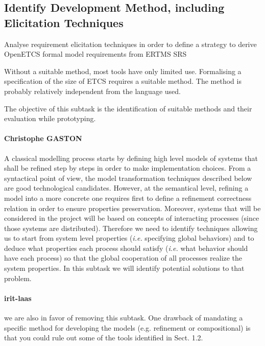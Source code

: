 \documentclass{template/openetcs_article}
\begin{document}
\subsection{Identify Development Method, including Elicitation Techniques}

Analyse requirement elicitation techniques in order to define a strategy to derive OpenETCS formal model requirements from ERTMS SRS

Without a suitable method, most tools have only limited use.  Formalising a specification of the size of ETCS requires a suitable method.  The method is probably relatively independent from the language used.

The objective of this subtask is the identification of suitable methods and their evaluation while prototyping.

\paragraph{Christophe GASTON}
A classical modelling process starts by defining high level models of systems that shall be refined step by steps in order
to make implementation choices. From a syntactical point of view, the model transformation techniques described below are good technological candidates. However, at the semantical level, refining a model into a more concrete one requires first to define a refinement correctness relation in order to ensure properties preservation. Moreover, systems that will be considered in the project will be based on concepts of interacting processes (since those systems are distributed). Therefore we need to identify techniques allowing us to start from system level properties ({\em i.e.} specifying global behaviors) and to deduce what properties each process should satisfy ({\em i.e.} what behavior should have each process) so that the global cooperation of all processes realize the system properties. In this subtask we will identify potential solutions to that problem.

\paragraph{irit-laas} we are also in favor of removing this
subtask. One drawback of mandating a specific method for developing
the models (e.g. refinement or compositional) is that you could rule
out some of the tools identified in Sect. 1.2.
\end{document}
